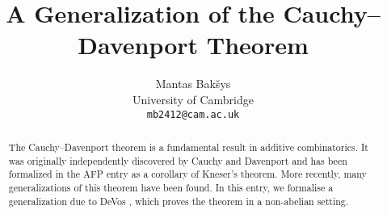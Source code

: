 \documentclass[11pt,a4paper]{article}
\begin{document}
\title{A Generalization of the Cauchy--Davenport Theorem}
\author{Mantas Bak\v{s}ys \\
University of Cambridge\\
\texttt{mb2412@cam.ac.uk}}

\maketitle
                                                             
\begin{abstract}
The Cauchy--Davenport theorem is a fundamental result in additive combinatorics.
It was originally independently discovered by Cauchy \cite{cauchy1812recherches} and Davenport \cite{davenport} and has been formalized in the AFP entry \cite{Kneser_Cauchy_Davenport-AFP} as a corollary of Kneser's theorem.
More recently, many generalizations of this theorem have been found. In this entry, we formalise a generalization due to DeVos \cite{DeVos2016OnAG}, which proves the theorem in a non-abelian setting.
\end{abstract}
\newpage
\tableofcontents

\newpage






\end{document}
